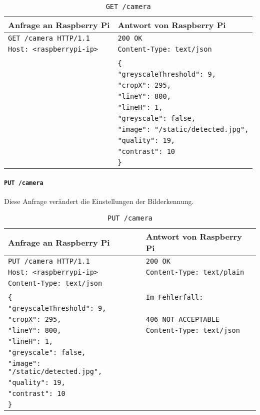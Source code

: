 \begin{table}[h!]
	\centering
	\begin{tabular}{|l|l|}
		\hline Anfrage an Raspberry Pi & Antwort von Raspberry Pi \\ 
		\hline \texttt{GET /camera HTTP/1.1} & \texttt{200 OK} \\
		\texttt{Host: <raspberrypi-ip>} & \texttt{Content-Type: text/json} \\
		& \\
		& \verb|{| \\
		& \verb|"greyscaleThreshold": 9,| \\
		& \verb|"cropX": 295,| \\
		& \verb|"lineY": 800,| \\
		& \verb|"lineH": 1,| \\
		& \verb|"greyscale": false,| \\
		& \verb|"image": "/static/detected.jpg",| \\
		& \verb|"quality": 19,| \\
		& \verb|"contrast": 10| \\
		& \verb|}| \\
		\hline 
	\end{tabular} 
	\caption{\texttt{GET /camera}}
	\label{tab:get-camera}
\end{table}

\newpage

\paragraph{\texttt{PUT /camera}}

Diese Anfrage verändert die Einstellungen der Bilderkennung.

\begin{table}[h!]
	\centering
	\begin{tabular}{|l|l|}
		\hline Anfrage an Raspberry Pi & Antwort von Raspberry Pi \\ 
		\hline \texttt{PUT /camera HTTP/1.1} & \texttt{200 OK} \\
		\texttt{Host: <raspberrypi-ip>} & \texttt{Content-Type: text/plain} \\
		\texttt{Content-Type: text/json} & \\
		& \\
		\verb|{| & \verb|Im Fehlerfall:| \\
		\verb|"greyscaleThreshold": 9,| & \\
		\verb|"cropX": 295,| & \verb|406 NOT ACCEPTABLE| \\
		\verb|"lineY": 800,| & \verb|Content-Type: text/json| \\
		\verb|"lineH": 1,| & \\
		\verb|"greyscale": false,| & \\
		\verb|"image": "/static/detected.jpg",| & \\
		\verb|"quality": 19,| & \\
		\verb|"contrast": 10| & \\
		\verb|}| & \\
		\hline 
	\end{tabular} 
	\caption{\texttt{PUT /camera}}
	\label{tab:put-camera}
\end{table}

